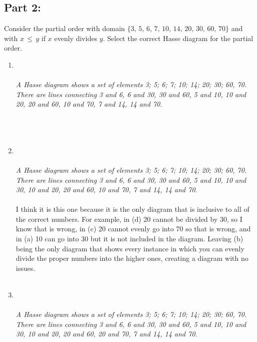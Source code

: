 \subsection*{Part 2:}
Consider the partial order with domain $\{3,\, 5,\, 6, \,7,\, 10,\, 14,\, 20,\, 30,\, 60,\, 70\}$ and with $x\,\leq \,y$ if $x$ evenly divides $y$. Select the correct Hasse diagram for the partial order.

\begin{enumerate}[label=(\alph*)]
\item
{}
\\\\
{\color{blue}{\bf Figure 2:} \emph{A Hasse diagram shows a set of elements {3; 5; 6; 7; 10; 14; 20; 30; 60, 70}. There are lines connecting 3 and 6, 6 and 30, 30 and 60, 5 and 10, 10 and 20, 20 and 60, 10 and 70, 7 and 14, 14 and 70.
}
}
\\
\\
\\\\
\newpage
\item
{}
\\\\
{\color{blue}{\bf Figure 3:} \emph{A Hasse diagram shows a set of elements {3; 5; 6; 7; 10; 14; 20; 30; 60, 70}. There are lines connecting 3 and 6, 6 and 30, 30 and 60, 5 and 10, 10 and 30, 10 and 20, 20 and 60, 10 and 70, 7 and 14, 14 and 70.
}
}
\\
\\
  I think it is this one because it is the only diagram that is inclusive to all of the correct numbers. For example, in (d) 20 cannot be divided by 30, so I know that is wrong, in (c) 20 cannot evenly go into 70 so that is wrong, and in (a) 10 can go into 30 but it is not included in the diagram. Leaving (b) being the only diagram that shows every instance in which you can evenly divide the proper numbers into the higher ones, creating a diagram with no issues. 
\\\\
\newpage
\item
{}
\\\\
{\color{blue}{\bf Figure 4:} \emph{A Hasse diagram shows a set of elements {3; 5; 6; 7; 10; 14; 20; 30; 60, 70}. There are lines connecting 3 and 6, 6 and 30, 30 and 60, 5 and 10, 10 and 30, 10 and 20, 20 and 60, 20 and 70, 7 and 14, 14 and 70.
}}
\end{enumerate}
